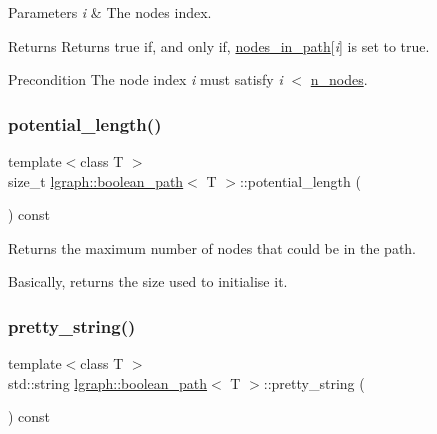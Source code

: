 \begin{DoxyParams}{Parameters}
{\em i} & The node\textquotesingle{}s index. \\
\hline
\end{DoxyParams}
\begin{DoxyReturn}{Returns}
Returns true if, and only if, \hyperlink{classlgraph_1_1boolean__path_a0ea5d4c5f7e445270bb5c0346ec7c150}{nodes\+\_\+in\+\_\+path}\mbox{[}{\itshape i}\mbox{]} is set to true. 
\end{DoxyReturn}
\begin{DoxyPrecond}{Precondition}
The node index {\itshape i} must satisfy {\itshape i} $<$ \hyperlink{classlgraph_1_1boolean__path_a98f07b983e0812fd283f16c3871793ef}{n\+\_\+nodes}. 
\end{DoxyPrecond}
\mbox{\label{classlgraph_1_1boolean__path_a64d9fc30eb11b6edec66e0d54e6081b3}} 
\subsubsection{\texorpdfstring{potential\+\_\+length()}{potential\_length()}}
{\footnotesize\ttfamily template$<$class T $>$ \\
size\+\_\+t \hyperlink{classlgraph_1_1boolean__path}{lgraph\+::boolean\+\_\+path}$<$ T $>$\+::potential\+\_\+length (\begin{DoxyParamCaption}{ }\end{DoxyParamCaption}) const}



Returns the maximum number of nodes that could be in the path. 

Basically, returns the size used to initialise it. \mbox{\label{classlgraph_1_1boolean__path_a5c3df2487f9c5b096d845b8d11ba0e0c}} 
\subsubsection{\texorpdfstring{pretty\+\_\+string()}{pretty\_string()}\hspace{0.1cm}{\footnotesize\ttfamily [1/2]}}
{\footnotesize\ttfamily template$<$class T $>$ \\
std\+::string \hyperlink{classlgraph_1_1boolean__path}{lgraph\+::boolean\+\_\+path}$<$ T $>$\+::pretty\+\_\+string (\begin{DoxyParamCaption}{ }\end{DoxyParamCaption}) const}



